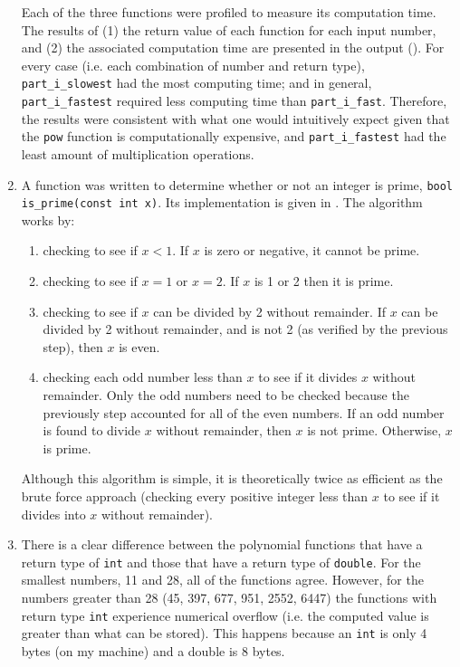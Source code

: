 \documentclass{article}
\begin{document}
\begin{enumerate}[label=\roman*)]
    Each of the three functions were profiled to measure its computation time.
    The results of (1) the return value of each function for each input number, and (2) the associated computation time are presented in the output ().
    For every case (i.e. each combination of number and return type), \texttt{part\_i\_slowest} had the most computing time; and in general, \texttt{part\_i\_fastest} required less computing time than \texttt{part\_i\_fast}.
    Therefore, the results were consistent with what one would intuitively expect given that the \texttt{pow} function is computationally expensive, and \texttt{part\_i\_fastest} had the least amount of multiplication operations.
  \item A function was written to determine whether or not an integer is prime, \texttt{bool is\_prime(const int x)}.
    Its implementation is given in .
    The algorithm works by:
    \begin{enumerate}
      \item checking to see if $x < 1$.
        If $x$ is zero or negative, it cannot be prime.
      \item checking to see if $x = 1$ or $x = 2$.
        If $x$ is 1 or 2 then it is prime.
      \item checking to see if $x$ can be divided by 2 without remainder.
        If $x$ can be divided by 2 without remainder, and is not 2 (as verified by the previous step), then $x$ is even.
      \item checking each odd number less than $x$ to see if it divides $x$ without remainder.
        Only the odd numbers need to be checked because the previously step accounted for all of the even numbers.
        If an odd number is found to divide $x$ without remainder, then $x$ is not prime.
        Otherwise, $x$ is prime.
    \end{enumerate}
    Although this algorithm is simple, it is theoretically twice as efficient as the brute force approach (checking every positive integer less than $x$ to see if it divides into $x$ without remainder).
    \item There is a clear difference between the polynomial functions that have a return type of \texttt{int} and those that have a return type of \texttt{double}.
     For the smallest numbers, 11 and 28, all of the functions agree.
     However, for the numbers greater than 28 (45, 397, 677, 951, 2552, 6447) the functions with return type \texttt{int} experience numerical overflow (i.e. the computed value is greater than what can be stored).
     This happens because an \texttt{int} is only 4 bytes (on my machine) and a double is 8 bytes.
\end{enumerate}
\end{document}
